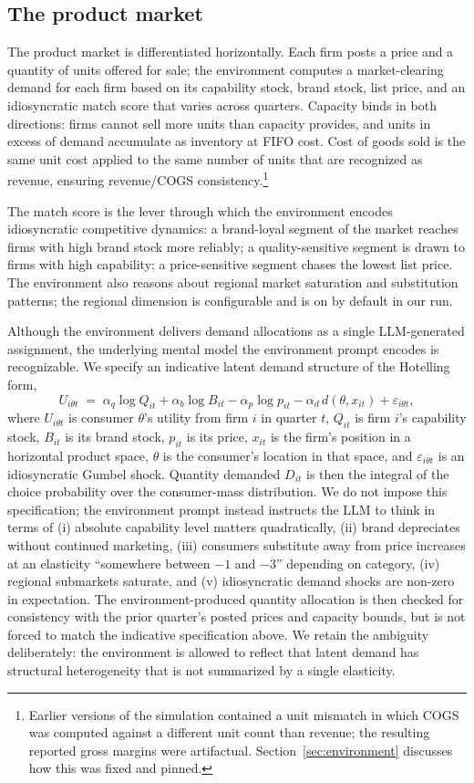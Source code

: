 \documentclass[11pt]{article}
\begin{document}
\subsection{The product market}

The product market is differentiated horizontally. Each firm posts a
price and a quantity of units offered for sale; the environment computes
a market-clearing demand for each firm based on its capability stock,
brand stock, list price, and an idiosyncratic match score that varies
across quarters. Capacity binds in both directions: firms cannot sell
more units than capacity provides, and units in excess of demand
accumulate as inventory at FIFO cost. Cost of goods sold is the same
unit cost applied to the same number of units that are recognized as
revenue, ensuring revenue/COGS consistency.\footnote{Earlier versions of
the simulation contained a unit mismatch in which COGS was computed
against a different unit count than revenue; the resulting reported
gross margins were artifactual. Section~\ref{sec:environment} discusses
how this was fixed and pinned.}

The match score is the lever through which the environment
encodes idiosyncratic competitive dynamics: a brand-loyal segment of
the market reaches firms with high brand stock more reliably; a
quality-sensitive segment is drawn to firms with high capability; a
price-sensitive segment chases the lowest list price. The environment
also reasons about regional market saturation and substitution patterns;
the regional dimension is configurable and is on by default in our run.

Although the environment delivers demand allocations as a single
LLM-generated assignment, the underlying mental model the environment
prompt encodes is recognizable. We specify an indicative latent demand
structure of the Hotelling form,
\[
U_{i\theta t} \;=\; \alpha_q \log Q_{it} + \alpha_b \log B_{it}
  - \alpha_p \log p_{it} - \alpha_d \, d(\theta, x_{it}) + \varepsilon_{i\theta t},
\]
where $U_{i\theta t}$ is consumer $\theta$'s utility from firm $i$ in
quarter $t$, $Q_{it}$ is firm $i$'s capability stock, $B_{it}$ is its
brand stock, $p_{it}$ is its price, $x_{it}$ is the firm's position in
a horizontal product space, $\theta$ is the consumer's location in
that space, and $\varepsilon_{i\theta t}$ is an idiosyncratic Gumbel
shock. Quantity demanded $D_{it}$ is then the integral of the choice
probability over the consumer-mass distribution. We do not impose this
specification; the environment prompt instead instructs the LLM to
think in terms of (i) absolute capability level matters quadratically,
(ii) brand depreciates without continued marketing, (iii) consumers
substitute away from price increases at an elasticity ``somewhere
between $-1$ and $-3$'' depending on category, (iv) regional submarkets
saturate, and (v) idiosyncratic demand shocks are non-zero in
expectation. The environment-produced quantity allocation is then
checked for consistency with the prior quarter's posted prices and
capacity bounds, but is not forced to match the indicative
specification above. We retain the ambiguity deliberately: the
environment is allowed to reflect that latent demand has structural
heterogeneity that is not summarized by a single elasticity.
\end{document}
